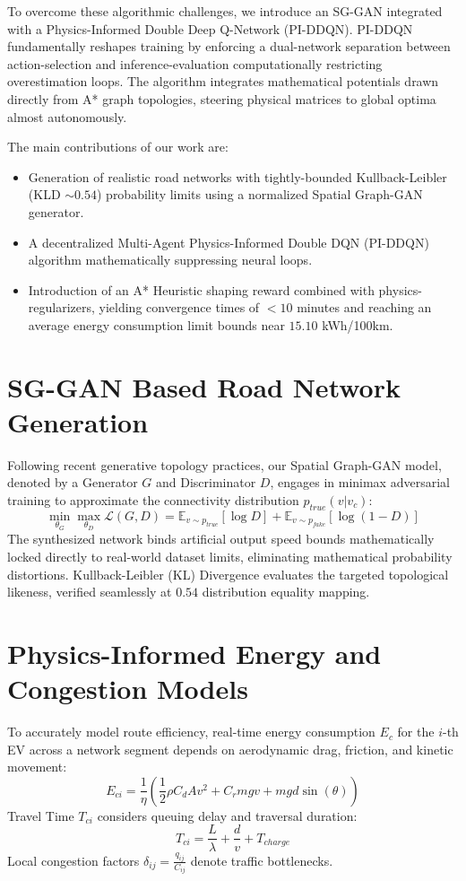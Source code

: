 \documentclass[journal]{IEEEtran}
\begin{document}
To overcome these algorithmic challenges, we introduce an SG-GAN integrated with a Physics-Informed Double Deep Q-Network (PI-DDQN). PI-DDQN fundamentally reshapes training by enforcing a dual-network separation between action-selection and inference-evaluation computationally restricting overestimation loops. The algorithm integrates mathematical potentials drawn directly from A* graph topologies, steering physical matrices to global optima almost autonomously. 

The main contributions of our work are:
\begin{itemize}
    \item Generation of realistic road networks with tightly-bounded Kullback-Leibler (KLD $\sim 0.54$) probability limits using a normalized Spatial Graph-GAN generator.
    \item A decentralized Multi-Agent Physics-Informed Double DQN (PI-DDQN) algorithm mathematically suppressing neural loops.
    \item Introduction of an A* Heuristic shaping reward combined with physics-regularizers, yielding convergence times of $< 10$ minutes and reaching an average energy consumption limit bounds near $15.10$ kWh/100km.
\end{itemize}

\section{SG-GAN Based Road Network Generation}
Following recent generative topology practices, our Spatial Graph-GAN model, denoted by a Generator $G$ and Discriminator $D$, engages in minimax adversarial training to approximate the connectivity distribution $p_{true}(v | v_c)$:
\begin{equation}
\min_{\theta_G} \max_{\theta_D} \mathcal{L}(G,D) = \mathbb{E}_{v \sim p_{true}}[\log D] + \mathbb{E}_{v \sim p_{fake}}[\log(1 - D)]
\end{equation}
The synthesized network binds artificial output speed bounds mathematically locked directly to real-world dataset limits, eliminating mathematical probability distortions. Kullback-Leibler (KL) Divergence evaluates the targeted topological likeness, verified seamlessly at $0.54$ distribution equality mapping.

\section{Physics-Informed Energy and Congestion Models}
To accurately model route efficiency, real-time energy consumption $E_c$ for the $i$-th EV across a network segment depends on aerodynamic drag, friction, and kinetic movement:
\begin{equation}
E_{ci} = \frac{1}{\eta} \left(\frac{1}{2}\rho C_d A v^2 + C_r m g v + m g d \sin(\theta)\right)
\end{equation}
Travel Time $T_{ci}$ considers queuing delay and traversal duration:
\begin{equation}
T_{ci} = \frac{L}{\lambda} + \frac{d}{v} + T_{charge}
\end{equation}
Local congestion factors $\delta_{ij} = \frac{q_{ij}}{C_{ij}}$ denote traffic bottlenecks. 
\end{document}

